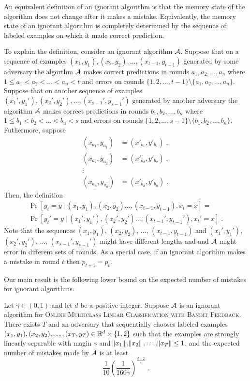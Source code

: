 An equivalent definition of an ignorant algorithm is that the memory state of
the algorithm does not change after it makes a mistake. Equivalently,
the memory state of an ignorant algorithm is completely determined
by the sequence of labeled examples on which it made correct prediction.

To explain the definition, consider an ignorant algorithm $\mathcal{A}$. Suppose that
on a sequence of examples $(x_1, y_1), (x_2, y_2), \dots, (x_{t-1}, y_{t-1})$
generated by some adversary the algorthm $\mathcal{A}$ makes correct predictions in
rounds $a_1, a_2, \dots, a_n$ where $1 \le a_1 < a_2 < \dots < a_n < t$ and
errors on rounds $\{1,2,\dots,t-1\} \setminus \{a_1, a_2, \dots, a_n\}$. Suppose
that on another sequence of examples $(x_1', y_1'), (x_2', y_2'), \dots,
(x_{s-1}', y_{s-1}')$ generated by another adversary the algorithm $\mathcal{A}$ makes
correct predictions in rounds $b_1, b_2, \dots, b_n$ where $1 \le b_1 < b_2 <
\dots < b_n < s$ and errors on rounds $\{1,2,\dots,s-1\} \setminus \{b_1, b_2,
\dots, b_n\}$. Futhermore, suppose
\begin{align*}
(x_{a_1}, y_{a_1}) &= (x'_{b_1}, y'_{b_1}) \; , \\
(x_{a_2}, y_{a_2}) &= (x'_{b_2}, y'_{b_2}) \; , \\
\vdots \\
(x_{a_n}, y_{a_n}) &= (x'_{b_2}, y'_{b_n}) \; .
\end{align*}
Then, the definition
\begin{multline*}
\Pr[y_t = y ~|~ (x_1, y_1), (x_2, y_2) \dots, (x_{t-1}, y_{t-1}), x_t = x] = \\
\Pr[y_t' = y ~|~ (x_1', y_1'), (x_2', y_2') \dots, (x_{t-1}', y_{t-1}'), x_t' = x] \; .
\end{multline*}
Note that the sequences $(x_1, y_1)$, $(x_2, y_2)$, $\dots$, $(x_{t-1},
y_{t-1})$ and $(x_1', y_1')$, $(x_2', y_2')$, $\dots$, $(x_{s-1}', y_{s-1}')$
might have different lengths and and $\mathcal{A}$ might error in different sets of
rounds. As a special case, if an ignorant algorithm makes a mistake in round $t$
then $p_{t+1}=p_t$.

Our main result is the following lower bound on the expected number of mistakes
for ignorant algorithms.

\begin{theorem}
\label{theorem:ignorant-lower-bound}
Let $\gamma \in (0,1)$ and let $d$ be a positive integer. Suppose $\mathcal{A}$ is an
ignorant algorithm for \textsc{Online Multiclass Linear Classification with
Bandit Feedback}. There exists $T$ and an adversary that sequentially chooses
labeled examples $(x_1, y_1), (x_2, y_2), \dots, (x_T, y_T) \in \mathbb{R}^d\times
\{1,2\}$ such that the examples are strongly linearly separable with magin
$\gamma$ and $\norm{x_1}, \norm{x_2}, \dots, \norm{x_T} \le 1$, and the expected
number of mistakes made by $\mathcal{A}$ is at least
$$
\frac{1}{10} \left(\frac{1}{160\gamma}\right)^{\frac{d-2}{4}} \; .
$$
\end{theorem}

